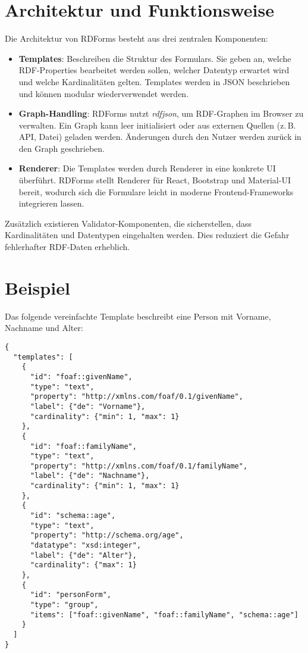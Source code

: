 \documentclass[11pt,a4paper]{article}
\begin{document}
\section{Architektur und Funktionsweise}
Die Architektur von RDForms besteht aus drei zentralen Komponenten:

\begin{itemize}[itemsep=0.5em]
  \item \textbf{Templates}: Beschreiben die Struktur des Formulars. 
  Sie geben an, welche RDF-Properties bearbeitet werden sollen, welcher Datentyp erwartet wird und welche Kardinalitäten gelten. 
  Templates werden in JSON beschrieben und können modular wiederverwendet werden.
  
  \item \textbf{Graph-Handling}: RDForms nutzt \emph{rdfjson}, um RDF-Graphen im Browser zu verwalten. 
  Ein Graph kann leer initialisiert oder aus externen Quellen (z.\,B. API, Datei) geladen werden. Änderungen durch den Nutzer werden zurück in den Graph geschrieben.
  
  \item \textbf{Renderer}: Die Templates werden durch Renderer in eine konkrete UI überführt. 
  RDForms stellt Renderer für React, Bootstrap und Material-UI bereit, wodurch sich die Formulare leicht in moderne Frontend-Frameworks integrieren lassen.
\end{itemize}

Zusätzlich existieren Validator-Komponenten, die sicherstellen, dass Kardinalitäten und Datentypen eingehalten werden. 
Dies reduziert die Gefahr fehlerhafter RDF-Daten erheblich.

\section{Beispiel}
Das folgende vereinfachte Template beschreibt eine Person mit Vorname, Nachname und Alter:

\begin{verbatim}
{
  "templates": [
    {
      "id": "foaf::givenName",
      "type": "text",
      "property": "http://xmlns.com/foaf/0.1/givenName",
      "label": {"de": "Vorname"},
      "cardinality": {"min": 1, "max": 1}
    },
    {
      "id": "foaf::familyName",
      "type": "text",
      "property": "http://xmlns.com/foaf/0.1/familyName",
      "label": {"de": "Nachname"},
      "cardinality": {"min": 1, "max": 1}
    },
    {
      "id": "schema::age",
      "type": "text",
      "property": "http://schema.org/age",
      "datatype": "xsd:integer",
      "label": {"de": "Alter"},
      "cardinality": {"max": 1}
    },
    {
      "id": "personForm",
      "type": "group",
      "items": ["foaf::givenName", "foaf::familyName", "schema::age"]
    }
  ]
}
\end{verbatim}
\end{document}
